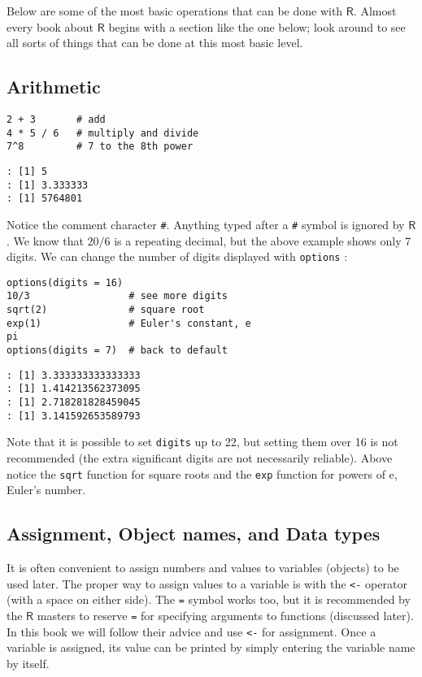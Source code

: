 Below are some of the most basic operations that can be done with
\(\mathsf{R}\). Almost every book about \(\mathsf{R}\) begins with a
section like the one below; look around to see all sorts of things
that can be done at this most basic level.

\subsection{Arithmetic}
\label{sec-2-3-1}

\begin{verbatim}
2 + 3       # add
4 * 5 / 6   # multiply and divide
7^8         # 7 to the 8th power
\end{verbatim}

\begin{verbatim}
: [1] 5
: [1] 3.333333
: [1] 5764801
\end{verbatim}

Notice the comment character \texttt{\#}. Anything typed
after a \texttt{\#} symbol is ignored by \(\mathsf{R}\). We know that \(20/6\)
is a repeating decimal, but the above example shows only 7 digits. We
can change the number of digits displayed with
\texttt{options} :

\begin{verbatim}
options(digits = 16)
10/3                 # see more digits
sqrt(2)              # square root
exp(1)               # Euler's constant, e
pi       
options(digits = 7)  # back to default
\end{verbatim}

\begin{verbatim}
: [1] 3.333333333333333
: [1] 1.414213562373095
: [1] 2.718281828459045
: [1] 3.141592653589793
\end{verbatim}

Note that it is possible to set \texttt{digits}
 up to 22, but setting them
over 16 is not recommended (the extra significant digits are not
necessarily reliable). Above notice the \texttt{sqrt}
 function for square roots and the
\texttt{exp}  function for powers of
\(\mathrm{e}\), Euler's number.

\subsection{Assignment, Object names, and Data types}
\label{sec-2-3-2}

It is often convenient to assign numbers and values to variables
(objects) to be used later. The proper way to assign values to a
variable is with the \texttt{<-} operator (with a space on either side). The
\verb~=~ symbol works too, but it is recommended by the \(\mathsf{R}\)
masters to reserve \verb~=~ for specifying arguments to functions
(discussed later). In this book we will follow their advice and use
\texttt{<-} for assignment. Once a variable is assigned, its value can be
printed by simply entering the variable name by itself.

